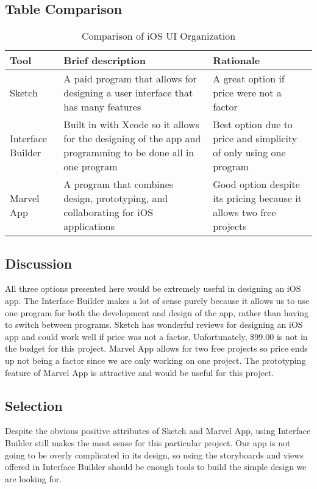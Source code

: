 \documentclass[letterpaper,10pt,draftclsnofoot,onecolumn,titlepage]{IEEEtran}
\begin{document}
	\subsection{Table Comparison}
	\begin{table}[ht]
	\caption{Comparison of iOS UI Organization}
	\begin{center}
	\begin{tabular} { | m{3cm} | m{5cm} | m{5cm} | }
	\hline\hline
	Tool & Brief description & Rationale \\ [0.5ex]
	\hline
	Sketch & A paid program that allows for designing a user interface that has many features & A great option if price were not a factor \\
	\hline
	Interface Builder & Built in with Xcode so it allows for the designing of the app and programming to be done all in one program & Best option due to price and simplicity of only using one program \\
	\hline
	Marvel App & A program that combines design, prototyping, and collaborating for iOS applications & Good option despite its pricing because it allows two free projects \\
	\hline
	\end{tabular}
	\end{center}
	\end{table}

	\subsection{Discussion}
	All three options presented here would be extremely useful in designing an iOS app.
	The Interface Builder makes a lot of sense purely because it allows us to use one program for both the development and design of the app, rather than having to switch between programs.
	Sketch has wonderful reviews for designing an iOS app and could work well if price was not a factor.
	Unfortunately, \$99.00 is not in the budget for this project.
	Marvel App allows for two free projects so price ends up not being a factor since we are only working on one project.
	The prototyping feature of Marvel App is attractive and would be useful for this project.

	\subsection{Selection}
	Despite the obvious positive attributes of Sketch and Marvel App, using Interface Builder still makes the most sense for this particular project.
	Our app is not going to be overly complicated in its design, so using the storyboards and views offered in Interface Builder should be enough tools to build the simple design we are looking for.
\end{document}
